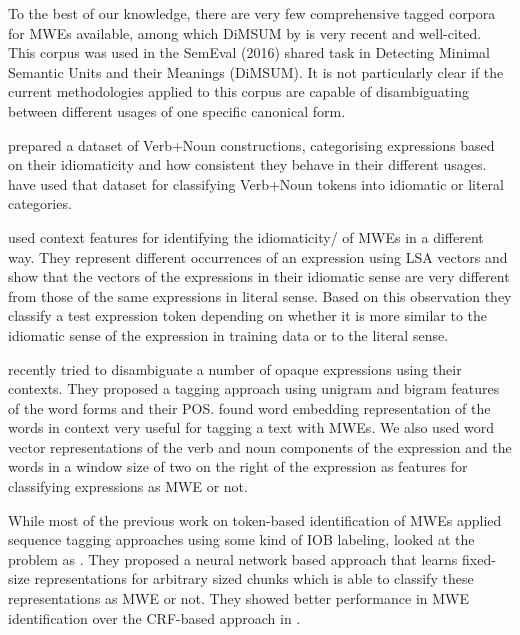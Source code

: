 \documentclass[output=paper
,modfonts
,nonflat]{langsci/langscibook}
\begin{document}
To the best of our knowledge, there are very few comprehensive tagged corpora for MWEs available, among which DiMSUM by \cite{schneider-dimsum:2016} is very recent and well-cited. This corpus was used in the SemEval (2016) shared task in Detecting Minimal Semantic Units and their Meanings (DiMSUM).
It is not particularly clear if the current methodologies applied to this corpus are capable of disambiguating between different usages of one specific canonical form.


\cite{cook2008vnc} prepared a dataset of  Verb+Noun constructions, categorising expressions based on their idiomaticity and how consistent they behave in their different usages. \cite{fazly-cook-stevenson:2009:CL} have used that dataset for classifying Verb+Noun tokens into idiomatic or literal categories.

\cite{Katz06automaticidentification} used context features for identifying the idiomaticity\// of MWEs in a different way. They represent different occurrences of an expression using LSA vectors and show that the vectors of the expressions in their idiomatic sense are very different from those of the same expressions in literal sense. Based on this observation they classify a test expression token depending on whether it is more similar to the idiomatic sense of the expression in training data or to the literal sense. %

\cite{scholivet-ramisch:2017:MWE2017} recently tried to disambiguate a number of opaque  expressions using their contexts. They proposed a tagging approach using unigram and bigram features of the word forms and their POS.
\cite{Qu+:2015a} found word embedding representation of the words in context very useful for tagging a text with MWEs. We also used word vector representations of the verb and noun components of the expression and the words in a window size of two on the right of the expression as features for classifying expressions as MWE or not. 

While most of the previous work on token-based identification of MWEs applied sequence tagging approaches using some kind of IOB labeling, \cite{legrand2016phrase} looked at the problem as . They proposed a neural network based approach that learns fixed-size representations for arbitrary sized chunks which is able to classify these representations as MWE or not. They showed better performance in MWE identification over the CRF-based approach in \cite{constant2013}.
\end{document}
